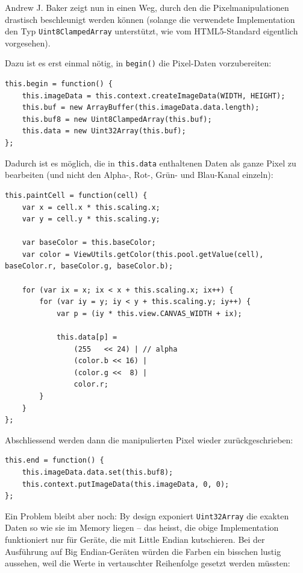 \documentclass[11pt]{report} %
\theoremstyle{definition}
\begin{document}
Andrew J. Baker zeigt nun in \cite{mdn:PixelCanvas} einen Weg, durch den die Pixelmanipulationen drastisch beschleunigt werden können (solange die verwendete Implementation den Typ {\tt Uint8ClampedArray} unterstützt, wie vom HTML5-Standard  \cite{wthree:twodcanvas} eigentlich vorgesehen).

Dazu ist es erst einmal nötig, in {\tt begin()} die Pixel-Daten vorzubereiten:

\begin{lstlisting}
this.begin = function() {
	this.imageData = this.context.createImageData(WIDTH, HEIGHT);
	this.buf = new ArrayBuffer(this.imageData.data.length);
	this.buf8 = new Uint8ClampedArray(this.buf);
	this.data = new Uint32Array(this.buf);
};
\end{lstlisting}

Dadurch ist es möglich, die in {\tt this.data} enthaltenen Daten als ganze Pixel zu bearbeiten (und nicht den Alpha-, Rot-, Grün- und Blau-Kanal einzeln):

\begin{lstlisting}
this.paintCell = function(cell) {
	var x = cell.x * this.scaling.x;
	var y = cell.y * this.scaling.y;
	
	var baseColor = this.baseColor;
	var color = ViewUtils.getColor(this.pool.getValue(cell), baseColor.r, baseColor.g, baseColor.b);
		
	for (var ix = x; ix < x + this.scaling.x; ix++) {
		for (var iy = y; iy < y + this.scaling.y; iy++) {
			var p = (iy * this.view.CANVAS_WIDTH + ix);
			
			this.data[p] =
				(255   << 24) | // alpha
				(color.b << 16) |
				(color.g <<  8) |
				color.r;
		}
	}
};
\end{lstlisting}

Abschliessend werden dann die manipulierten Pixel wieder zurückgeschrieben:

\begin{lstlisting}
this.end = function() {
	this.imageData.data.set(this.buf8);
	this.context.putImageData(this.imageData, 0, 0);
};
\end{lstlisting}

Ein Problem bleibt aber noch: By design exponiert {\tt Uint32Array} die exakten Daten so wie sie im Memory liegen -- das heisst, die obige Implementation funktioniert nur für Geräte, die mit Little Endian kutschieren. Bei der Ausführung auf Big Endian-Geräten würden die Farben ein bisschen lustig aussehen, weil die Werte in vertauschter Reihenfolge gesetzt werden müssten:
\end{document}
